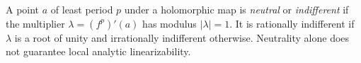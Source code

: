 
A point $a$ of least period $p$ under a holomorphic map is \emph{neutral} or \emph{indifferent} if the multiplier $\lambda=(f^p)'(a)$ has modulus $|\lambda|=1$. It is rationally indifferent if $\lambda$ is a root of unity and irrationally indifferent otherwise. Neutrality alone does not guarantee local analytic linearizability.
